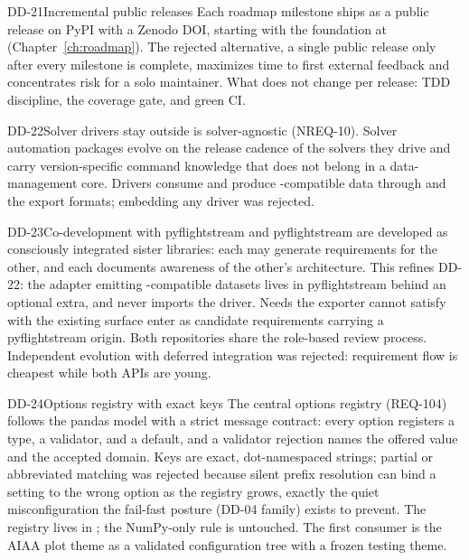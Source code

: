 \begin{ddbox}{DD-21}{Incremental public releases}
Each roadmap milestone ships as a public release on PyPI with a Zenodo
DOI, starting with the foundation at 
(Chapter~\ref{ch:roadmap}). The rejected alternative, a single public
release only after every milestone is complete, maximizes time to first
external feedback and concentrates risk for a solo maintainer. What does
not change per release: TDD discipline, the coverage gate, and green CI.
\end{ddbox}

\begin{ddbox}{DD-22}{Solver drivers stay outside \itc{}}
\itc{} is solver-agnostic (NREQ-10). Solver automation packages evolve on
the release cadence of the solvers they drive and carry version-specific
command knowledge that does not belong in a data-management core. Drivers
consume and produce \itc{}-compatible data through  and the
export formats; embedding any driver was rejected.
\end{ddbox}

\begin{ddbox}{DD-23}{Co-development with pyflightstream}
\itc{} and pyflightstream are developed as consciously integrated sister
libraries: each may generate requirements for the other, and each
documents awareness of the other's architecture. This refines DD-22: the
adapter emitting \itc{}-compatible datasets lives in pyflightstream
behind an optional extra, and \itc{} never imports the driver. Needs the
exporter cannot satisfy with the existing \itc{} surface enter as
candidate requirements carrying a pyflightstream origin. Both
repositories share the role-based review process. Independent evolution
with deferred integration was rejected: requirement flow is cheapest
while both APIs are young.
\end{ddbox}

\begin{ddbox}{DD-24}{Options registry with exact keys}
The central options registry (REQ-104) follows the pandas
 model with a strict message contract: every
option registers a type, a validator, and a default, and a validator
rejection names the offered value and the accepted domain. Keys are
exact, dot-namespaced strings; partial or abbreviated matching was
rejected because silent prefix resolution can bind a setting to the
wrong option as the registry grows, exactly the quiet misconfiguration
the fail-fast posture (DD-04 family) exists to prevent. The registry
lives in ; the NumPy-only rule is untouched. The
first consumer is the AIAA plot theme as a validated configuration tree
with a frozen testing theme.
\end{ddbox}

